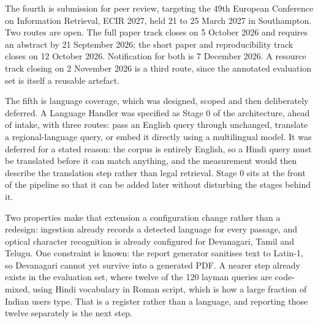 \documentclass[12pt,a4paper]{article}
\begin{document}
The fourth is submission for peer review, targeting the 49th European Conference on Information Retrieval, ECIR 2027, held 21 to 25 March 2027 in Southampton. Two routes are open. The full paper track closes on 5 October 2026 and requires an abstract by 21 September 2026; the short paper and reproducibility track closes on 12 October 2026. Notification for both is 7 December 2026. A resource track closing on 2 November 2026 is a third route, since the annotated evaluation set is itself a reusable artefact.

The fifth is language coverage, which was designed, scoped and then deliberately deferred. A Language Handler was specified as Stage 0 of the architecture, ahead of intake, with three routes: pass an English query through unchanged, translate a regional-language query, or embed it directly using a multilingual model. It was deferred for a stated reason: the corpus is entirely English, so a Hindi query must be translated before it can match anything, and the measurement would then describe the translation step rather than legal retrieval. Stage 0 sits at the front of the pipeline so that it can be added later without disturbing the stages behind it.

Two properties make that extension a configuration change rather than a redesign: ingestion already records a detected language for every passage, and optical character recognition is already configured for Devanagari, Tamil and Telugu. One constraint is known: the report generator sanitises text to Latin-1, so Devanagari cannot yet survive into a generated PDF. A nearer step already exists in the evaluation set, where twelve of the 120 layman queries are code-mixed, using Hindi vocabulary in Roman script, which is how a large fraction of Indian users type. That is a register rather than a language, and reporting those twelve separately is the next step.
\end{document}
